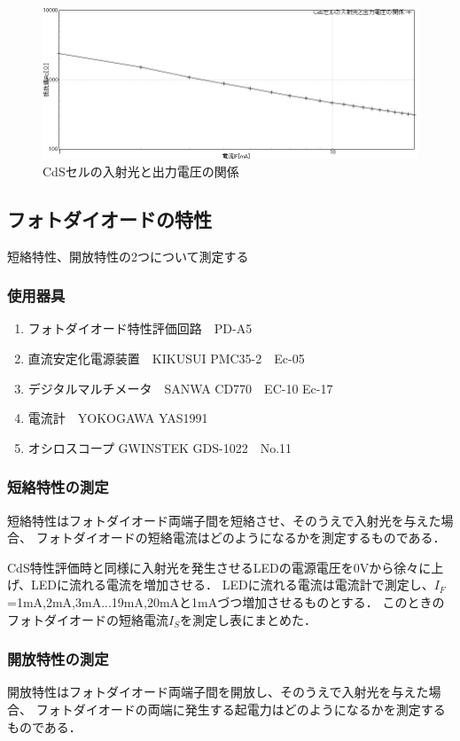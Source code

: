 \documentclass[titlepage]{jarticle}
\begin{document}
\begin{figure}[H]
    \begin{center}
        \includegraphics[width=12cm]{graph/1.PNG}
        \caption{CdSセルの入射光と出力電圧の関係}
        \label{fig:CdSセルの入射光と出力電圧の関係}
    \end{center}
\end{figure}

\newpage

\subsection{フォトダイオードの特性}
短絡特性、開放特性の2つについて測定する
\subsubsection{使用器具}
\begin{enumerate}
    \item フォトダイオード特性評価回路　PD-A5
    \item 直流安定化電源装置　KIKUSUI PMC35-2　Ec-05
    \item デジタルマルチメータ　SANWA CD770　EC-10 Ec-17
    \item 電流計　YOKOGAWA YAS1991
    \item オシロスコープ GWINSTEK  GDS-1022　No.11
\end{enumerate}
\subsubsection{短絡特性の測定}
短絡特性はフォトダイオード両端子間を短絡させ、そのうえで入射光を与えた場合、
フォトダイオードの短絡電流はどのようになるかを測定するものである．

CdS特性評価時と同様に入射光を発生させるLEDの電源電圧を0Vから徐々に上げ、LEDに流れる電流を増加させる．
LEDに流れる電流は電流計で測定し、$I_F$=1mA,2mA,3mA...19mA,20mAと1mAづつ増加させるものとする．
このときのフォトダイオードの短絡電流$I_S$を測定し表にまとめた．
\subsubsection{開放特性の測定}
開放特性はフォトダイオード両端子間を開放し、そのうえで入射光を与えた場合、
フォトダイオードの両端に発生する起電力はどのようになるかを測定するものである．
\end{document}
